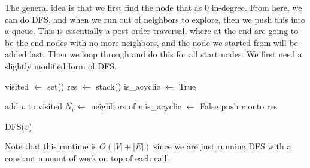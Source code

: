   \begin{algo}
    The general idea is that we first find the node that as $0$ in-degree. From here, we can do DFS, and when we run out of neighbors to explore, then we push this into a queue. This is essentially a post-order traversal, where at the end are going to be the end nodes with no more neighbors, and the node we started from will be added last. Then we loop through and do this for all start nodes. We first need a slightly modified form of DFS. 

    \begin{algorithm}[H]
      \label{alg:iterative_top_sort}
      \begin{algorithmic}[1]
        \State visited $\gets$ set()
        \State res $\gets$ stack() 
        \State is\_acyclic $\gets$ True

            \State add $v$ to visited 
            \State $N_v \gets$ neighbors of $v$ 
                \State is\_acyclic $\gets$ False 
              \EndIf
              \State {}
            \EndFor 
            \State push $v$ onto res
          \EndIf
        \EndFunction

        \State 

            \State DFS($v$)
          \EndFor
            \State {}
          \EndIf
          \State {}
        \EndFunction
      \end{algorithmic}
    \end{algorithm}
    Note that this runtime is $O(|V| + |E|)$ since we are just running DFS with a constant amount of work on top of each call. 
  \end{algo}

